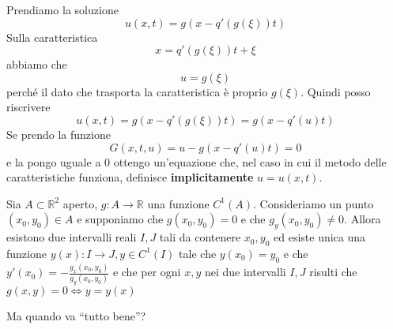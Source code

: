Prendiamo la soluzione
\begin{equation*}
    u(x,t) =g(x-q'(g(\xi)) t)
\end{equation*}
Sulla caratteristica
\begin{equation*}
    x=q'(g(\xi))t +\xi
\end{equation*}
abbiamo che
\begin{equation*}
    u=g(\xi)
\end{equation*}
perché il dato che trasporta la caratteristica è proprio $\displaystyle g(\xi)$. Quindi posso riscrivere
\begin{equation*}
    u(x,t) =g(x-q'(g(\xi)) t) =g(x-q'(u) t)
\end{equation*}
Se prendo la funzione
\begin{equation*}
    G(x,t,u) =u-g(x-q'(u) t) =0
\end{equation*}
e la pongo uguale a $0$ ottengo un'equazione che, nel caso in cui il metodo delle caratteristiche funziona, definisce \textbf{implicitamente} $\displaystyle u=u(x,t)$.

\begin{theorem}
     Sia $A\subset \mathbb{R}^2$ aperto, $g:A\to \mathbb{R} $ una funzione $C^{1}(A) $. Consideriamo un punto $(x_{0},y_{0})\in A$ e supponiamo che $g(x_{0},y_{0})=0$ e che $g_{y}(x_{0},y_{0})\neq 0$. Allora esistono due intervalli reali $I,J$ tali da contenere $x_{0},y_{0}$ ed esiste unica una funzione $y(x):I\to J, y\in C^{1}(I) $ tale che $y(x_{0})=y_{0}$ e che $y'(x_{0})=-\frac{g_{x}(x_{0},y_{0})}{g_{y}(x_{0},y_{0})}$ e che per ogni $x,y$ nei due intervalli $I,J$ risulti che $g(x,y)=0 \Leftrightarrow y=y(x)$
\end{theorem}

Ma quando va ``tutto bene''?


